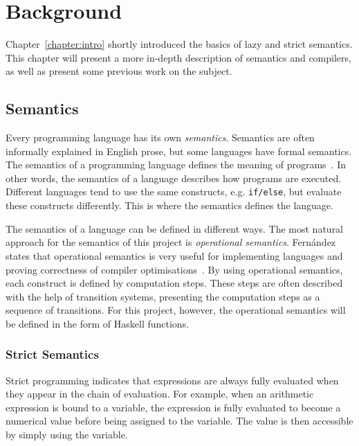 \chapter{Background}
Chapter~\ref{chapter:intro} shortly introduced the basics of lazy and strict
semantics. This chapter will present a more in-depth description of semantics
and compilers, as well as present some previous work on the subject.

\section{Semantics}
Every programming language has its own \textit{semantics}. Semantics are often
informally explained in English prose, but some languages have formal semantics.
The semantics of a programming language defines
the meaning of programs~\cite{Fernand:PLangOpSem}.
In other words, the semantics of a language describes how programs are executed.
Different languages tend to use the same constructs, e.g. \texttt{if/else}, but
evaluate these constructs differently. This is where the semantics defines the
language.

The semantics of a language can be defined in different ways. The most
natural approach for the semantics of this project is
\textit{operational semantics}. Fernández states that operational semantics
is very useful for implementing languages and proving correctness of compiler
optimisations~\cite{Fernand:PLangOpSem}. By using operational
semantics, each construct is defined by computation steps. These steps are
often described with the help of transition systems, presenting the computation
steps as a sequence of transitions. For this project, however,
the operational semantics will be defined in the form of Haskell functions.


\subsection{Strict Semantics}
Strict programming indicates that expressions are always fully evaluated when
they appear in the chain of evaluation. For example, when an arithmetic expression
is bound to a variable, the expression is fully evaluated to become a numerical
value before being assigned to the variable. The value is then accessible
by simply using the variable.

